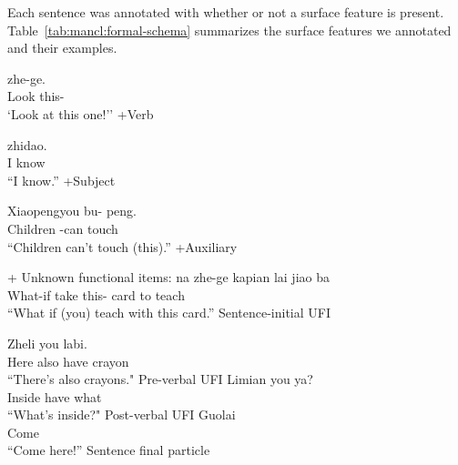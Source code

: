 Each sentence was annotated with whether or not a surface feature is present. Table~\ref{tab:mancl:formal-schema} summarizes the surface features we annotated and their examples.  


\begin{exe} \label{mancl:schema:formal:verb}
\ex 
\gll {} zhe-ge.\\
Look this-\Cl{}\\
\trans `Look at this one!'' \hfill +Verb
\end{exe}

\gll {} zhidao.\\
I know\\
\trans ``I know.'' \hfill +Subject
\eex

\bxl
\gll Xiaopengyou bu- peng.\\
Children \Neg-can touch\\
\trans ``Children can't touch (this).'' \hfill +Auxiliary
\exl
\eex

+ Unknown functional items:
\bxl
\gll {} na zhe-ge kapian lai jiao ba\\
What-if take this-\Cl{} card to teach \Sfp{}\\
\trans ``What if (you) teach with this card.''  \hfill Sentence-initial UFI

\ex
\gll Zheli  you labi.\\
Here also have crayon\\
\trans ``There's also crayons." \hfill Pre-verbal UFI
\ex
\gll  Limian you  ya?\\
Inside have what \Sfp{}\\
\trans ``What's inside?" \hfill Post-verbal UFI
\ex 
\gll Guolai \\
Come \Sfp{}\\
\trans ``Come here!'' \hfill Sentence final particle
\exl
\eex

